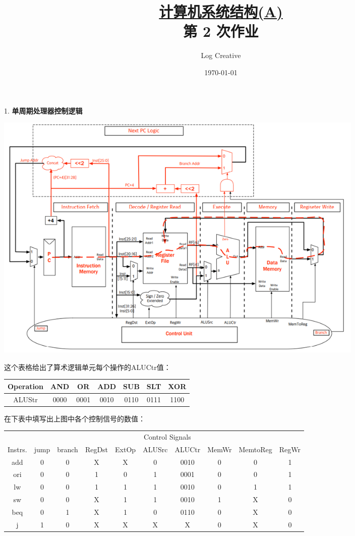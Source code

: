 \documentclass[12pt,a4paper]{article}
\newenvironment{problems}{\begin{list}{}{\renewcommand{\makelabel}[1]{\textbf{##1}.\hfil}}}{\end{list}}
\begin{document}
\title{\normalsize \underline{计算机系统结构(A)}\\\LARGE 第 2 次作业}
\author{Log Creative }
\date{\today}
\maketitle

\begin{problems}
    \item[1.] \textbf{单周期处理器控制逻辑}
    
    \includegraphics[width=0.8\textwidth]{p1.png}

    这个表格给出了算术逻辑单元每个操作的ALUCtr值：

    \begin{tabular}{|c|cccccc|}
        \hline
        Operation & AND & OR & ADD & SUB & SLT & XOR \\
        \hline
        ALUStr & 0000 & 0001 & 0010 & 0110 & 0111 & 1100\\
        \hline
    \end{tabular}

    在下表中填写出上图中各个控制信号的数值：
    
    \begin{tabular}{c|ccccccccc}
        & \multicolumn{9}{c}{Control Signals}\\
        Instrs. & \sffamily jump & \sffamily branch & \sffamily RegDst &\sffamily ExtOp &\sffamily ALUSrc &\sffamily ALUCtr &\sffamily MemWr &\sffamily MemtoReg &\sffamily RegWr \\ 
        \hline
        \ttfamily add &0&0& X & X & 0 & 0010 & 0 & 0 & 1 \\ 
        \ttfamily ori &0&0& 1 & 0 & 1 & 0001 & 0 & 0 & 1 \\
        \ttfamily lw  &0&0& 1 & 1 & 1 & 0010 & 0 & 1 & 1 \\ 
        \ttfamily sw  &0&0& X & 1 & 1 & 0010 & 1 & X & 0 \\ 
        \ttfamily beq &0&1& X & 1 & 0 & 0110 & 0 & X & 0 \\
        \ttfamily j   &1&0& X & X & X &  X   & 0 & X & 0 \\
        \hline
    \end{tabular}



\end{problems}
\end{document}
